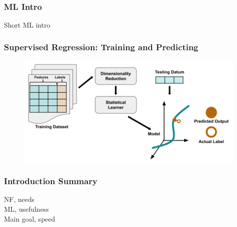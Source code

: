 \begin{frame}
  \frametitle{ML Intro}
  Short ML intro
\end{frame}

\begin{frame}
  \frametitle{Supervised Regression: Training and Predicting}
  \begin{figure}
    \centering
    \includegraphics[width=\textwidth]{./figures/SupervisedRegression.png}
  \end{figure}
\end{frame}

\begin{frame}
  \frametitle{Introduction Summary}
  NF, needs\\
  ML, usefulness\\
  Main goal, speed
\end{frame}

